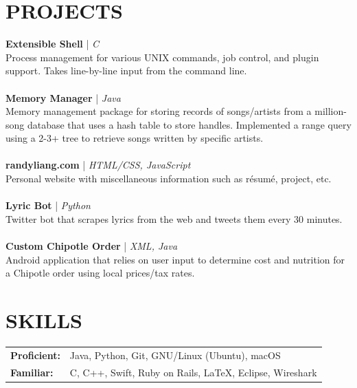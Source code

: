 \documentclass[line,margin]{res}
\begin{document}
\begin{resume}
	\section{PROJECTS}
	\textbf{Extensible Shell} | {\sl C}\\ Process management for various UNIX commands, job control, and plugin support. Takes line-by-line input from the command line.\\\\
	\textbf{Memory Manager} | {\sl Java}\\ 
	Memory management package for storing records of songs/artists from a million-song database that uses a hash table to store handles. Implemented a range query using a 2-3+ tree to retrieve songs written by specific artists.\\\\
	\textbf{randyliang.com} | {\sl HTML/CSS, JavaScript}\\ Personal website with miscellaneous information such as r\'esum\'e, project, etc.\\\\
	\textbf{Lyric Bot} | {\sl Python}\\ Twitter bot that scrapes lyrics from the web and tweets them every 30 minutes.\\\\
	\textbf{Custom Chipotle Order} | {\sl XML, Java}\\ Android application that relies on user input to determine cost and nutrition for a Chipotle order using local prices/tax rates.
	\section{SKILLS}
	\begin{tabular}{@{}ll}
		\textbf{Proficient:} & Java, Python, Git, GNU/Linux (Ubuntu), macOS            \\
		\textbf{Familiar:}   & C, C++, Swift, Ruby on Rails, \LaTeX, Eclipse, Wireshark \\		
	\end{tabular} 
	\vspace{10mm}
\end{resume}
\end{document}

